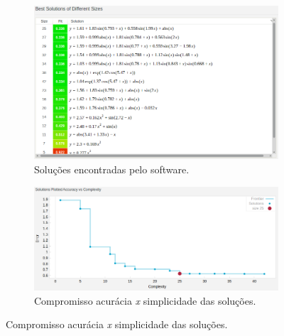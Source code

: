	\begin{figure}[h!]
	
	\centering
	
		\begin{subfigure}{.45\textwidth} 
		  \centering
		  \includegraphics[width=1\linewidth]{image/best_solucao_map1_r}
		  \caption{\centering Soluções encontradas pelo software.} 
		  \label{fig:map1_solucoes_c_ruido} 
		\end{subfigure}%
		\begin{subfigure}{.55\textwidth}
		  \centering
		  \includegraphics[width=1\linewidth]{image/pareto_map1_r}
		  \caption{\centering Compromisso acurácia \textit{x} simplicidade das
		  soluções.}
		  \label{fig:map1_pareto_c_ruido} 
		\end{subfigure}
	

\end{figure}
